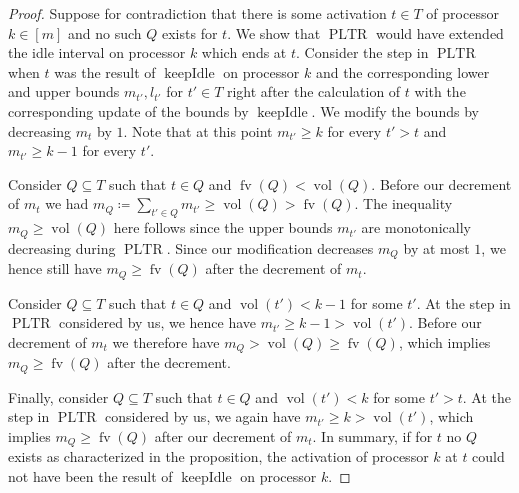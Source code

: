 \documentclass[a4paper]{article}
\DeclareMathOperator{\PLTR}{PLTR}
\DeclareMathOperator{\fv}{fv}
\DeclareMathOperator{\vol}{vol}
\DeclareMathOperator{\keepidle}{keepIdle}
\begin{document}
\begin{proof}
  Suppose for contradiction that there is some activation $t \in T$ of processor $k \in [m]$ and no such $Q$ exists for $t$.
  We show that $\PLTR$ would have extended the idle interval on processor $k$ which ends at $t$.
  Consider the step in $\PLTR$ when $t$ was the result of $\keepidle$ on processor $k$ and the corresponding lower and upper bounds $m_{t'}, l_{t'}$ for $t' \in T$ right after the calculation of $t$ with the corresponding update of the bounds by $\keepidle$.
  We modify the bounds by decreasing $m_t$ by $1$.
  Note that at this point $m_{t'} \geq k$ for every $t' > t$ and $m_{t'} \geq k - 1$ for every $t'$.

  Consider $Q \subseteq T$ such that $t \in Q$ and $\fv(Q) < \vol(Q)$.
  Before our decrement of $m_t$ we had $m_Q \coloneqq \sum_{t' \in Q} m_{t'} \geq \vol(Q) > \fv(Q)$.
  The inequality $m_Q \geq \vol(Q)$ here follows since the upper bounds $m_{t'}$ are monotonically decreasing during $\PLTR$.
  Since our modification decreases $m_Q$ by at most $1$, we hence still have $m_Q \geq \fv(Q)$ after the decrement of $m_t$.

  Consider $Q \subseteq T$ such that $t \in Q$ and $\vol(t') < k - 1$ for some $t'$.
  At the step in $\PLTR$ considered by us, we hence have $m_{t'} \geq k - 1 > \vol(t')$.
  Before our decrement of $m_t$ we therefore have $m_Q > \vol(Q) \geq \fv(Q)$, which implies $m_Q \geq \fv(Q)$ after the decrement.

  Finally, consider $Q \subseteq T$ such that $t \in Q$ and $\vol(t') < k$ for some $t' > t$.
  At the step in $\PLTR$ considered by us, we again have $m_{t'} \geq k > \vol(t')$, which implies $m_Q \geq \fv(Q)$ after our decrement of $m_t$.
  In summary, if for $t$ no $Q$ exists as characterized in the proposition, the activation of processor $k$ at $t$ could not have been the result of $\keepidle$ on processor $k$.
\end{proof}
\end{document}
